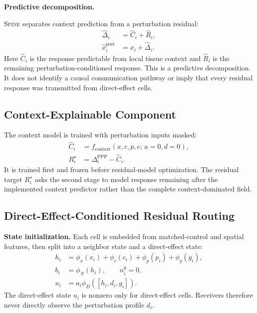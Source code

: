 \documentclass[sigconf,review,balance=false]{acmart}
\newcommand{\methodname}{\textsc{Spine}\xspace}
\begin{document}
\noindent\textbf{Predictive decomposition.}\par\noindent
\methodname{} separates context prediction from a perturbation residual:
\begin{equation}
\label{eq:niche_prop_decomposition}
\begin{aligned}
\widehat\Delta_i
&= \widehat C_i + \widehat R_i,\\
\widehat x_i^{\mathrm{post}}
&= x_i+\widehat\Delta_i .
\end{aligned}
\end{equation}
Here $\widehat C_i$ is the response predictable from local tissue context and
$\widehat R_i$ is the remaining perturbation-conditioned response. This is a
predictive decomposition. It does not identify a causal communication pathway
or imply that every residual response was transmitted from direct-effect cells.

\subsection{Context-Explainable Component}
\label{sec:method_niche_impact}

The context model is trained with perturbation inputs masked:
\begin{equation}
\label{eq:niche_module_target}
\begin{aligned}
\widehat C_i
&= f_{\mathrm{context}}(x,c,p,e;\,a=0,d=0),\\
R_i^\star
&= \Delta_i^{\mathrm{PPP}}-\widehat C_i .
\end{aligned}
\end{equation}
It is trained first and frozen before residual-model optimization. The residual
target $R_i^\star$ asks the second stage to model response remaining after the
implemented context predictor rather than the complete context-dominated field.

\subsection{Direct-Effect-Conditioned Residual Routing}
\label{sec:method_graph_propagation}

\noindent\textbf{State initialization.}
Each cell is embedded from matched-control and spatial features, then split into a neighbor state and a direct-effect state:
\begin{equation}
\label{eq:state_initialization}
\begin{aligned}
h_i
&= \phi_x(x_i)+\phi_c(c_i)+\phi_p(p_i)+\phi_g(g_i),\\
b_i
&= \phi_N(h_i),\qquad n_i^0=0,\\
u_i
&= a_i\phi_D([h_i,d_i,g_i]) .
\end{aligned}
\end{equation}
The direct-effect state $u_i$ is nonzero only for direct-effect cells.
Receivers therefore never directly observe the perturbation profile $d_i$.
\end{document}
